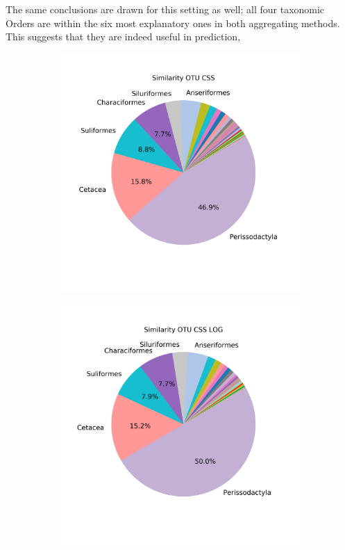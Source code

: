 The same conclusions are drawn for this setting as well; all four taxonomic Orders are within the six most explanatory ones in both aggregating methods. This suggests that they are indeed useful in prediction,
\begin{figure}[!h]
	\centering
	\begin{subfigure}{0.45\textwidth}
		\includegraphics[width=\textwidth]{rfr_dis_mean_pieOTU CSS}
		\caption{}
		\label{fig:dissimotucss}
	\end{subfigure}
	\begin{subfigure}{0.45\textwidth}
		\includegraphics[width=\textwidth]{rfr_dis_mean_pieOTU CSS LOG}

\end{subfigure}
\end{figure}
